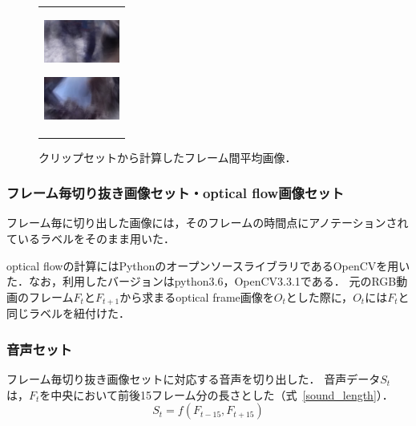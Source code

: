 \begin{figure}[H]
\begin{center}
\begin{tabular}{c}
\begin{minipage}{0.18\hsize}
\begin{center}
        \end{center}
      \end{minipage}
      \begin{minipage}{0.18\hsize}
        \begin{center}
          \includegraphics[clip, width=2.5cm]{./Figures/resque_mean1.eps}
          \hspace{0.1cm} { }
        \end{center}
      \end{minipage}
      \begin{minipage}{0.18\hsize}
        \begin{center}
          \includegraphics[clip, width=2.5cm]{./Figures/resque_mean5.eps}
          \hspace{0.2cm} { }
        \end{center}
      \end{minipage}
    \end{tabular}
    \caption{クリップセットから計算したフレーム間平均画像．}
    \label{resque_mean}
  \end{center}
\end{figure}

\subsubsection{フレーム毎切り抜き画像セット・optical flow画像セット}
フレーム毎に切り出した画像には，そのフレームの時間点にアノテーションされているラベルをそのまま用いた．

optical flowの計算にはPythonのオープンソースライブラリであるOpenCVを用いた．なお，利用したバージョンはpython3.6，OpenCV3.3.1である．
元のRGB動画のフレーム$F_t$と$F_{t+1}$から求まるoptical frame画像を$O_t$とした際に，$O_t$には$F_t$と同じラベルを紐付けた．


\subsubsection{音声セット}
フレーム毎切り抜き画像セットに対応する音声を切り出した．
音声データ$S_t$は，$F_t$を中央において前後15フレーム分の長さとした（式~\ref{sound_length}）．
\begin{equation}
\label{sound_length}
S_t = f(F_{t-15}, F_{t+15})
\end{equation}

